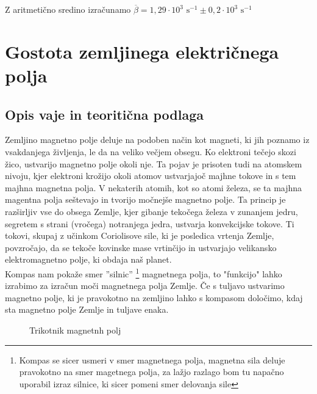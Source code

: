 \documentclass[12pt]{article}
\begin{document}
	Z aritmetično sredino izračunamo $\overline{\beta} = 1,29 \cdot 10^3 \text{ s}^{-1} \pm 0,2 \cdot 10^3 \text{ s}^{-1}$

\newpage
\section{Gostota zemljinega električnega polja}
	\subsection*{Opis vaje in teoritična podlaga}
	Zemljino magnetno polje deluje na podoben način kot magneti, ki jih poznamo iz vsakdanjega 
	življenja, le da na veliko večjem obsegu. Ko elektroni tečejo skozi žico, ustvarijo 
	magnetno polje okoli nje. Ta pojav je prisoten tudi na atomskem nivoju, kjer elektroni
	krožijo okoli atomov ustvarjajoč majhne tokove in s tem majhna magnetna polja. V
	nekaterih atomih, kot so atomi železa, se ta majhna magentna polja seštevajo in tvorijo
	močnejše magnetno polje. Ta princip je razširljiv vse do obsega Zemlje, kjer gibanje
	tekočega železa v zunanjem jedru, segretem s strani (vročega) notranjega jedra, ustvarja
	konvekcijske tokove. Ti tokovi, skupaj z učinkom Coriolisove sile, ki je posledica
	vrtenja Zemlje, povzročajo, da se tekoče kovinske mase vrtinčijo in ustvarjajo velikansko
	elektromagnetno polje, ki obdaja naš planet. \\

	Kompas nam pokaže smer ''silnic'' \footnote{Kompas se sicer usmeri v smer magnetnega polja,
	magnetna sila deluje pravokotno na smer magetnega polja, za lažjo razlago bom tu napačno
	uporabil izraz silnice, ki sicer pomeni smer delovanja sile} magnetnega polja, to "funkcijo"
	lahko izrabimo za izračun moči magnetnega polja Zemlje. Če s tuljavo ustvarimo magnetno
	polje, ki je pravokotno na zemljino lahko s kompasom določimo, kdaj sta magnetno polje
	Zemlje in tuljave enaka.
	\begin{figure}[h!]
		\centering
		\caption{Trikotnik magnetnh polj}
	\end{figure}
\end{document}

